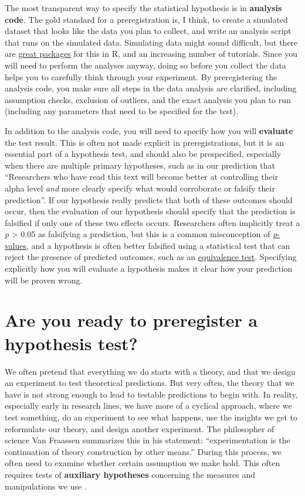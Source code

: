 \documentclass[
  oneside]{krantz}
\begin{document}
The most transparent way to specify the statistical hypothesis is in \textbf{analysis code}. The gold standard for a preregistration is, I think, to create a simulated dataset that looks like the data you plan to collect, and write an analysis script that runs on the simulated data. Simulating data might sound difficult, but there are \href{https://debruine.github.io/faux/}{great packages} for this in R, and an increasing number of tutorials. Since you will need to perform the analyses anyway, doing so before you collect the data helps you to carefully think through your experiment. By preregistering the analysis code, you make sure all steps in the data analysis are clarified, including assumption checks, exclusion of outliers, and the exact analysis you plan to run (including any parameters that need to be specified for the test).

In addition to the analysis code, you will need to specify how you will \textbf{evaluate} the test result. This is often not made explicit in preregistrations, but it is an essential part of a hypothesis test, and should also be prespecified, especially when there are multiple primary hypotheses, such as in our prediction that ``Researchers who have read this text will become better at controlling their alpha level \emph{and} more clearly specify what would corroborate or falsify their prediction''. If our hypothesis really predicts that both of these outcomes should occur, then the evaluation of our hypothesis should specify that the prediction is falsified if only one of these two effects occurs. Researchers often implicitly treat a \emph{p} \textgreater{} 0.05 as falsifying a prediction, but this is a common misconception of \protect\hyperlink{misconception1}{\emph{p}-values}, and a hypothesis is often better falsified using a statistical test that can reject the presence of predicted outcomes, such as an \protect\hyperlink{equivalencetest}{equivalence test}. Specifying explicitly how you will evaluate a hypothesis makes it clear how your prediction will be proven wrong.

\hypertarget{are-you-ready-to-preregister-a-hypothesis-test}{%
\section{Are you ready to preregister a hypothesis test?}\label{are-you-ready-to-preregister-a-hypothesis-test}}

We often pretend that everything we do starts with a theory, and that we design an experiment to test theoretical predictions. But very often, the theory that we have is not strong enough to lead to testable predictions to begin with. In reality, especially early in research lines, we have more of a cyclical approach, where we test something, do an experiment to see what happens, use the insights we get to reformulate our theory, and design another experiment. The philosopher of science Van Fraassen summarizes this in his statement: ``experimentation is the continuation of theory construction by other means.'' During this process, we often need to examine whether certain assumption we make hold. This often requires tests of \textbf{auxiliary hypotheses} concerning the measures and manipulations we use \citep{uygun_tunc_falsificationist_2022}.
\end{document}
